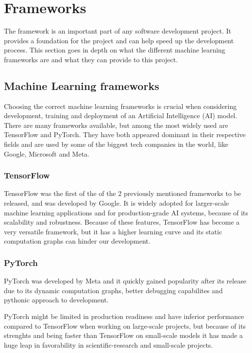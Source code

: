 \section{Frameworks}
\label{sec:Frameworks}

The framework is an important part of any software development project.
It provides a foundation for the project and can help speed up the development process. 
This section goes in depth on what the different machine learning frameworks
are and what they can provide to this project.

\subsection{Machine Learning frameworks}

Choosing the correct machine learning frameworks is crucial when considering development,
training and deployment of an Artificial Intelligence (AI) model.
There are many frameworks available, but among the most widely used are TensorFlow
and PyTorch. They have both appeared dominant in their respective fields and are used
by some of the biggest tech companies in the world, like Google, Microsoft and Meta.\cite{PyTorchVsTensorFlow}

\subsubsection{TensorFlow}
TensorFlow was the first of the of the 2 previously mentioned frameworks to be released,
and was developed by Google. \cite{TensorFlow} It is widely adopted for
larger-scale machine learning applications and for production-grade AI systems,
because of its scalability and robustness. \cite{simplilearn}
Because of these features, TensorFlow has become a very versatile framework,
but it has a higher learning curve and its static computation graphs can hinder our development.

\subsubsection{PyTorch}
PyTorch was developed by Meta and it quickly gained popularity after its release due to its dynamic
computation graphs, better debugging capabilites and pythonic approach to development. \cite{PyTorch}

PyTorch might be limited in production readiness and have inferior performance compared to
TensorFlow when working on large-scale projects, but because of its strenghts and being faster
than TensorFlow on small-scale models it has made a huge leap in favorability in
scientific-research and small-scale projects. \cite{simplilearn}

